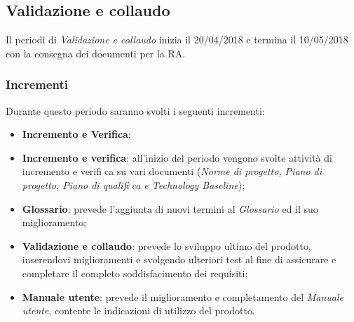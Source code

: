 \subsection{Validazione e collaudo}
Il periodi di \textit{Validazione e collaudo} inizia il 20/04/2018 e termina il 10/05/2018 con la consegna dei documenti per la RA. 

\subsubsection{Incrementi}
Durante questo periodo saranno svolti i seguenti incrementi:
\begin{itemize}
	\item \textbf{Incremento e Verifica}: \item \textbf{Incremento e verifica}: all'inizio del periodo vengono svolte attività di incremento e verifica su vari documenti (\textit{Norme di progetto, Piano di progetto, Piano di qualifica e Technology Baseline});
	\item \textbf{Glossario}: prevede l'aggiunta di nuovi termini al \textit{Glossario} ed il suo miglioramento;
	\item \textbf{Validazione e collaudo}: prevede lo sviluppo ultimo del prodotto, inserendovi miglioramenti e svolgendo ulteriori test al fine di assicurare e completare il completo soddisfacimento dei requisiti;
	\item \textbf{Manuale utente}: prevede il miglioramento e completamento del \textit{Manuale utente}, contente le indicazioni di utilizzo del prodotto.
\end{itemize}



